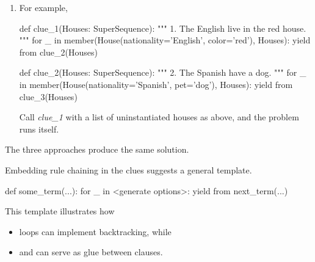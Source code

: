\begin{enumerate}
\item {} For example,

\begin{python}
  def clue_1(Houses: SuperSequence):
    """ 1. The English live in the red house.  """
    for _ in member(House(nationality='English', color='red'), Houses):
      yield from clue_2(Houses)
\end{python}


\begin{python}
  def clue_2(Houses: SuperSequence):
    """ 2. The Spanish have a dog. """
    for _ in member(House(nationality='Spanish', pet='dog'), Houses):
      yield from clue_3(Houses)
\end{python}

Call \textit{clue\_1} with a list of uninstantiated houses as above, and the problem runs itself.
\end{enumerate}

The three approaches produce the same solution.
\smallv
\smallv
\smallv

Embedding rule chaining in the clues suggests a general template.

\begin{python}
      def some_term(...):
        for _ in <generate options>:
          yield from next_term(...)
\end{python}

This template illustrates how
\begin{itemize}
\item {} loops can implement backtracking, while
\item {} and  can serve as glue between clauses. 
\end{itemize}
